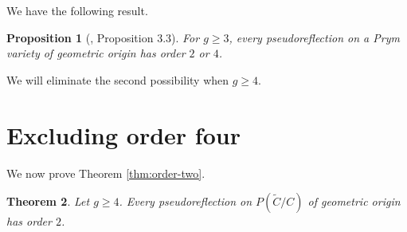 \documentclass{article}
\newtheorem{thm}{Theorem}[section]
\newtheorem{prop}[thm]{Proposition}
\numberwithin{equation}{section}
\begin{document}
We have the following result.

\begin{prop}[\cite{ALN}, Proposition 3.3]\label{thm:ALN-orders}
For $g\geq3$, every pseudoreflection on a Prym variety of geometric origin has order $2$ or $4$.
\end{prop}

We will eliminate the second possibility when $g\geq4$.

\section{Excluding order four}\label{sec:order4}

We now prove Theorem \ref{thm:order-two}.

\begin{thm}
\label{thm31}
Let $g\geq 4$. Every pseudoreflection on $P(\widetilde C/C)$ of geometric origin has order $2$.
\end{thm}
\end{document}
